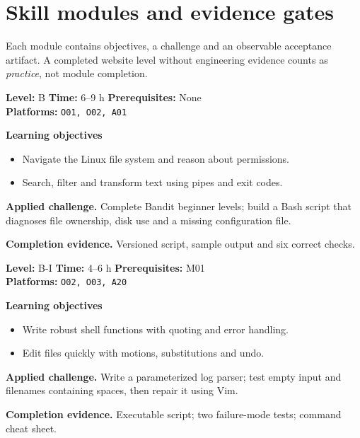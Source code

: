 \documentclass[10pt,letterpaper,oneside]{article}
\begin{document}
\section{Skill modules and evidence gates}
Each module contains objectives, a challenge and an observable acceptance artifact. A completed website level without engineering evidence counts as \emph{practice}, not module completion.
\begin{skillbox}[title={M01 \quad Linux and shell fundamentals}]
\textbf{Level:} B \quad \textbf{Time:} 6--9 h \quad \textbf{Prerequisites:} None\\
\textbf{Platforms:} \texttt{O01, O02, A01}\par
\textbf{Learning objectives}
\begin{itemize}
\item Navigate the Linux file system and reason about permissions.
\item Search, filter and transform text using pipes and exit codes.
\end{itemize}
\textbf{Applied challenge.} Complete Bandit beginner levels; build a Bash script that diagnoses file ownership, disk use and a missing configuration file.\par
\textbf{Completion evidence.} Versioned script, sample output and six correct checks.\par
\end{skillbox}
\vspace{2.5pt}
\begin{skillbox}[title={M02 \quad Bash automation and Vim editing}]
\textbf{Level:} B-I \quad \textbf{Time:} 4--6 h \quad \textbf{Prerequisites:} M01\\
\textbf{Platforms:} \texttt{O02, O03, A20}\par
\textbf{Learning objectives}
\begin{itemize}
\item Write robust shell functions with quoting and error handling.
\item Edit files quickly with motions, substitutions and undo.
\end{itemize}
\textbf{Applied challenge.} Write a parameterized log parser; test empty input and filenames containing spaces, then repair it using Vim.\par
\textbf{Completion evidence.} Executable script; two failure-mode tests; command cheat sheet.\par
\end{skillbox}
\end{document}
